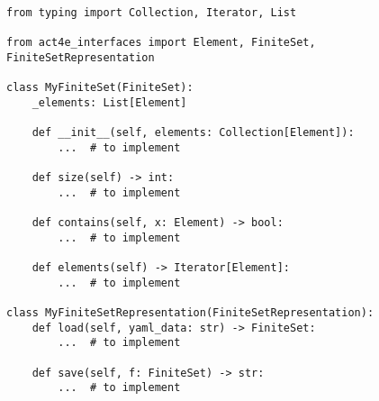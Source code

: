 \par\begin{minipage}{72ex}
\begin{verbatim}
from typing import Collection, Iterator, List

from act4e_interfaces import Element, FiniteSet, FiniteSetRepresentation

class MyFiniteSet(FiniteSet):
    _elements: List[Element]

    def __init__(self, elements: Collection[Element]):
        ...  # to implement

    def size(self) -> int:
        ...  # to implement

    def contains(self, x: Element) -> bool:
        ...  # to implement

    def elements(self) -> Iterator[Element]:
        ...  # to implement

class MyFiniteSetRepresentation(FiniteSetRepresentation):
    def load(self, yaml_data: str) -> FiniteSet:
        ...  # to implement

    def save(self, f: FiniteSet) -> str:
        ...  # to implement
\end{verbatim}
\end{minipage}\par
